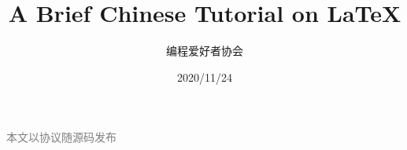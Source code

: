 
\begin{titlepage}
	\title{\bf \docTitle \\ A Brief Chinese Tutorial on \LaTeX}
	\author{编程爱好者协会}
	\date{2020/11/24}
	\maketitle
	\begin{center}
		\textcolor{gray}{本文以\licenseName 协议随源码发布}\\[2cm]
		\bigorglogo
	\end{center}
	\thispagestyle{empty}
	\newpage
\end{titlepage}
